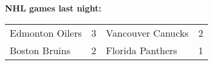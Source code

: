 \textbf{NHL games last night:}
\begin{tabular}{llll}
\toprule
Edmonton Oilers & 3 & Vancouver Canucks & 2 \\
  Boston Bruins & 2 &  Florida Panthers & 1 \\
\bottomrule
\end{tabular}
